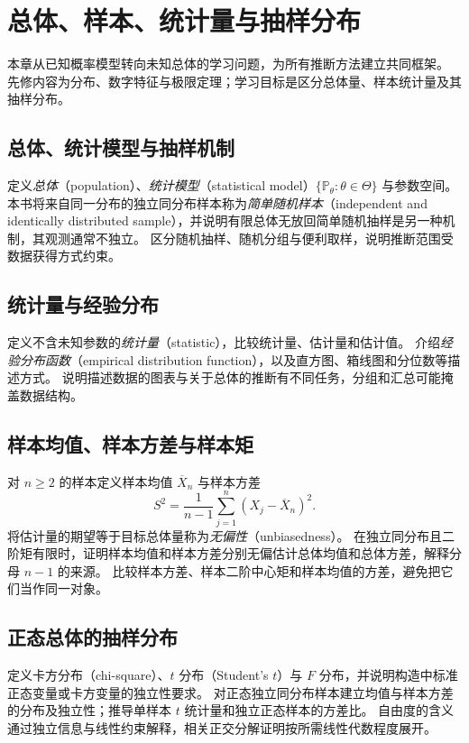 \setcounter{chapter}{9} %
\chapter{总体、样本、统计量与抽样分布}
\label{chap:ps-sampling}

本章从已知概率模型转向未知总体的学习问题，为所有推断方法建立共同框架。
先修内容为分布、数字特征与极限定理；学习目标是区分总体量、样本统计量及其抽样分布。

\section{总体、统计模型与抽样机制}
\label{sec:ps-statistical-model}
定义\emph{总体}（population）、\emph{统计模型}（statistical model）$\{\mathbb P_\theta:\theta\in\Theta\}$ 与参数空间。
本书将来自同一分布的独立同分布样本称为\emph{简单随机样本}（independent and identically distributed sample），并说明有限总体无放回简单随机抽样是另一种机制，其观测通常不独立。
区分随机抽样、随机分组与便利取样，说明推断范围受数据获得方式约束。

\section{统计量与经验分布}
\label{sec:ps-statistics-empirical}
定义不含未知参数的\emph{统计量}（statistic），比较统计量、估计量和估计值。
介绍\emph{经验分布函数}（empirical distribution function），以及直方图、箱线图和分位数等描述方式。
说明描述数据的图表与关于总体的推断有不同任务，分组和汇总可能掩盖数据结构。

\section{样本均值、样本方差与样本矩}
\label{sec:ps-sample-moments}
对 $n\geq2$ 的样本定义样本均值 $\overline X_n$ 与样本方差
\begin{equation}
  S^2=\frac{1}{n-1}\sum_{j=1}^n(X_j-\overline X_n)^2.
  \label{eq:ps-sample-variance}
\end{equation}
将估计量的期望等于目标总体量称为\emph{无偏性}（unbiasedness）。
在独立同分布且二阶矩有限时，证明样本均值和样本方差分别无偏估计总体均值和总体方差，解释分母 $n-1$ 的来源。
比较样本方差、样本二阶中心矩和样本均值的方差，避免把它们当作同一对象。

\section{正态总体的抽样分布}
\label{sec:ps-normal-sampling}
定义卡方分布（chi-square）、$t$ 分布（Student's $t$）与 $F$ 分布，并说明构造中标准正态变量或卡方变量的独立性要求。
对正态独立同分布样本建立均值与样本方差的分布及独立性；推导单样本 $t$ 统计量和独立正态样本的方差比。
自由度的含义通过独立信息与线性约束解释，相关正交分解证明按所需线性代数程度展开。

